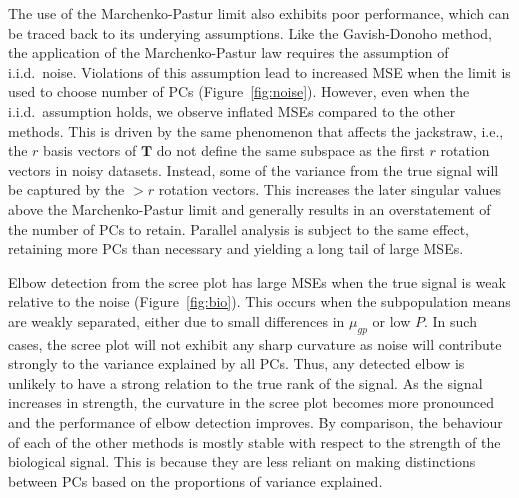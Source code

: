\documentclass[10pt,letterpaper]{article}
\begin{document}
The use of the Marchenko-Pastur limit also exhibits poor performance, which can be traced back to its underying assumptions.
Like the Gavish-Donoho method, the application of the Marchenko-Pastur law requires the assumption of i.i.d.\ noise.
Violations of this assumption lead to increased MSE when the limit is used to choose number of PCs (Figure~\ref{fig:noise}).
However, even when the i.i.d.\ assumption holds, we observe inflated MSEs compared to the other methods.
This is driven by the same phenomenon that affects the jackstraw, 
i.e., the $r$ basis vectors of $\mathbf{T}$ do not define the same subspace as the first $r$ rotation vectors in noisy datasets.
Instead, some of the variance from the true signal will be captured by the $>r$ rotation vectors.
This increases the later singular values above the Marchenko-Pastur limit and generally results in an overstatement of the number of PCs to retain. 
Parallel analysis is subject to the same effect, retaining more PCs than necessary and yielding a long tail of large MSEs.

Elbow detection from the scree plot has large MSEs when the true signal is weak relative to the noise (Figure~\ref{fig:bio}).
This occurs when the subpopulation means are weakly separated, either due to small differences in $\mu_{gp}$ or low $P$.
In such cases, the scree plot will not exhibit any sharp curvature as noise will contribute strongly to the variance explained by all PCs.
Thus, any detected elbow is unlikely to have a strong relation to the true rank of the signal.
As the signal increases in strength, the curvature in the scree plot becomes more pronounced and the performance of elbow detection improves.
By comparison, the behaviour of each of the other methods is mostly stable with respect to the strength of the biological signal.
This is because they are less reliant on making distinctions between PCs based on the proportions of variance explained.
\end{document}
